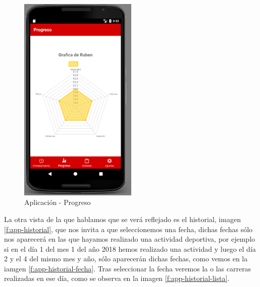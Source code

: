 \documentclass[a4paper, 11pt]{article}
\begin{document}
\begin{itemize}
            \begin{figure}[H]
             \centering
             \includegraphics[width=0.5\textwidth]{5progreso}
             \caption{Aplicación - Progreso}
             \label{f:app-progreso}
            \end{figure}


  La otra vista de la que hablamos que se verá reflejado es el historial, imagen \ref{f:app-historial}, que nos
  invita a que seleccionemos una fecha, dichas fechas sólo nos aparecerá en las que hayamos realizado  una
  actividad deportiva, por ejemplo si en el día 1 del mes 1 del año 2018 hemos realizado una actividad y
  luego el día 2 y el 4 del mismo mes y año, sólo aparecerán dichas fechas, como vemos en la iamgen
  \ref{f:app-historial-fecha}. Tras seleccionar la fecha veremos la o las carreras realizadas en ese día, como
  se observa en la imagen \ref{f:app-historial-lista}.\\




\end{itemize}
\end{document}
